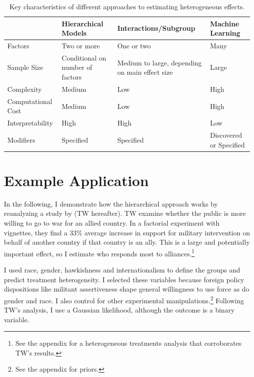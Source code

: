 \documentclass[12pt]{article}
\begin{document}
\begin{table}
\begin{tabular}{|p{1in}|p{1.5in}|p{1.5in}|p{1.5in}|} \hline
                 & Hierarchical Models & Interactions/Subgroup & Machine Learning \\
\hline
Factors              & Two or more          & One or two         & Many \\ \hline
Sample Size          & Conditional on number of factors            & Medium to large, depending on main effect size    & Large \\ \hline
Complexity           & Medium             & Low                & High \\ \hline
Computational Cost   & Medium             & Low                & High \\ \hline
Interpretability     & High               & High               & Low \\ \hline
Modifiers            & Specified          & Specified      & Discovered or Specified \\
\hline
\end{tabular}
\caption{Key characteristics of different approaches to estimating heterogeneous effects.}
\label{tab:tools-det}
\end{table}


\section{Example Application} 


In the following, I demonstrate how the hierarchical approach works by reanalyzing a study by \citet{TomzWeeks2021} (TW hereafter). 
TW examine whether the public is more willing to go to war for an allied country.
In a factorial experiment with vignettes, they find a 33\% average increase in support for military intervention on behalf of another country if that country is an ally. 
This is a large and potentially important effect, so I estimate who responds most to alliances.\footnote{See the appendix for a heterogeneous treatments analysis that corroborates TW's results.}


I used race, gender, hawkishness and internationalism to define the groups and predict treatment heterogeneity.
I selected these variables because foreign policy dispositions like militant assertiveness shape general willingness to use force \citep{Kertzeretal2014} as do gender \citep{Barnhartetal2020} and race. 
I also control for other experimental manipulations.\footnote{See the appendix for priors.} 
Following TW's analysis, I use a Gaussian likelihood, although the outcome is a binary variable. 
\end{document}
